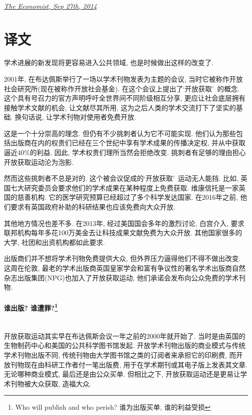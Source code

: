 \documentclass[a4paper, 12pt, UTF8]{article}
\begin{document}
\paragraph*{}
    \href{https://www.economist.com/science-and-technology/2014/09/27/grand-openings}{\emph{\small The Economist, Sep 27th, 2014}}

\section{译文}
学术进展的新发现将更容易进入公共领域, 也是时候做出这样的改变了.

2001年, 在布达佩斯举行了一场以学术刊物发表为主题的会议, 当时它被称作开放社会研究所(现在被称作开放社会基金). 在这个会议上提出了\lq 开放获取\rq\ 的概念. 这个具有号召力的官方声明呼吁全世界间不同阶级相互分享, 更应让社会底层拥有接触学术文献的机会, 让文献尽其所用, 这为之后人类的学术交流打下了坚实的基础. 换句话说, 让学术刊物对使用者免费开放.

这是一个十分崇高的理念. 但仍有不少挑刺者认为它不可能实现. 他们认为那些包括出版商在内的权贵们已经在三个世纪中享有学术成果的传播决定权, 并从中获取逼近40\%的利益. 因此, 学术权贵们理所当然会拒绝改变. 挑刺者有足够的理由担心开放获取运动沦为泡影.

然而这些挑刺者不总是对的. 这个被会议促成的\lq 开放获取\rq\ 运动无人能挡. 比如, 英国七大研究委员会要求他们的学术成果在某种程度上免费获取. 维康信托是一家英国的慈善机构. 它的医学研究预算已经超过了多个科学发达国家. 在2016年之前, 他们要求有英国政府补助的科研结果也应该免费向大众开放.

其他地方情况也差不多. 在2013年, 经过美国国会多年的激烈讨论, 白宫介入, 要求联邦机构每年多花100万美金去让科技成果文献免费为大众开放. 其他国家很多的大学, 社团和出资机构都如此要求.

出版商们并不想将学术刊物免费提供大众, 但外界压力逼得他们不得不做出改变. 这周在伦敦, 最老的学术出版商英国皇家学会和富有争议性的著名学术出版商自然杂志出版集团(NPG)也加入了开放获取运动, 他们承诺会发布向公众免费的学术刊物.

\paragraph*{\large 谁出版? 谁遭罪?\footnote[1]{Who will publish and who perish? 谁为出版买单, 谁的利益受损}} \hspace{10pt} \\

开放获取运动其实早在布达佩斯会议一年之前的2000年就开始了. 当时是由英国的生物制药中心和美国的公共科学图书馆发起. 开放学术刊物出版的商业模式与传统学术刊物出版不同, 传统刊物由大学图书馆之类的订阅者来承担它的印刷费, 而开放刊物现在由科研工作者付一笔出版费, 用于在学术期刊或其电子版上发表其文章. 无论哪种商业模式, 最后还是由公众买单. 但相比之下, 开放获取运动还是更易让学术刊物被大众获取, 造福大众.
\end{document}

